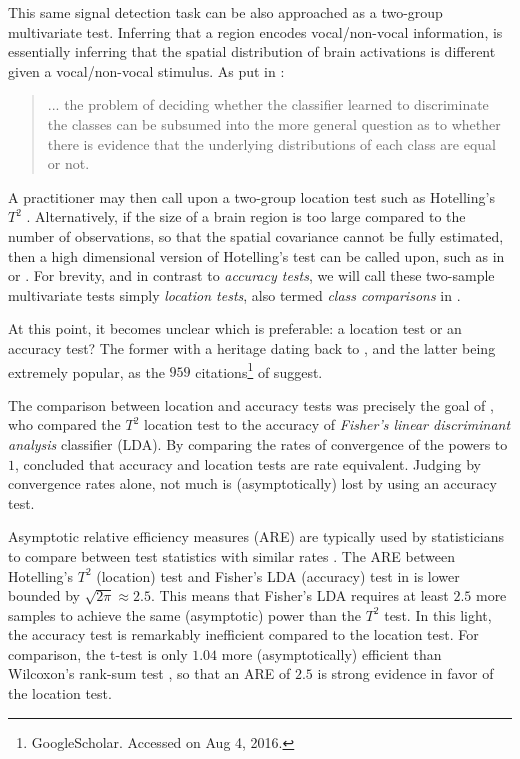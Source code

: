\documentclass[12pt,a4paper]{article}
\begin{document}
This same signal detection task can be also approached as a two-group multivariate test.
Inferring that a region encodes vocal/non-vocal information, is essentially inferring that the spatial distribution of brain activations is different given a vocal/non-vocal stimulus. 
As put in \cite{pereira_machine_2009}: 
\begin{quote}
... the problem of deciding whether the classifier learned to discriminate the classes can be subsumed into the more general question as to whether there is evidence that the underlying distributions of each class are equal or not.
\end{quote}
A practitioner may then call upon a two-group location test such as Hotelling's $T^2$ \citep{anderson_introduction_2003}.
Alternatively, if the size of a brain region is too large compared to the number of observations, so that the spatial covariance cannot be fully estimated, then a high dimensional version of Hotelling's test can be called upon, such as in \cite{schafer_shrinkage_2005} or \cite{srivastava_testing_2013}.
For brevity, and in contrast to \emph{accuracy tests}, we will call these two-sample multivariate tests simply \emph{location tests}, also termed \emph{class comparisons} in \cite{simon_pitfalls_2003}.

At this point, it becomes unclear which is preferable: a location test or an accuracy test?
The former with a heritage dating back to \cite{hotelling_generalization_1931}, and the latter being extremely popular, as the $959$ citations\footnote{GoogleScholar. Accessed on Aug 4, 2016.} of \cite{kriegeskorte_information-based_2006} suggest. 

The comparison between location and accuracy tests was precisely the goal of \cite{ramdas_classification_2016}, who compared the $T^2$ location test to the accuracy of \emph{Fisher's linear discriminant analysis} classifier (LDA). 
By comparing the rates of convergence of the powers to $1$, \cite{ramdas_classification_2016} concluded that accuracy and location tests are rate equivalent. 
Judging by convergence rates alone, not much is (asymptotically) lost by using an accuracy test. 

Asymptotic relative efficiency measures (ARE) are typically used by statisticians to compare between test statistics with similar rates \citep{vaart_asymptotic_1998}.
The ARE between Hotelling's $T^2$ (location) test and Fisher's LDA (accuracy) test in \cite{ramdas_classification_2016} is lower bounded by $\sqrt{2 \pi} \approx 2.5$. 
This means that Fisher's LDA requires at least $2.5$ more samples to achieve the same (asymptotic) power than the $T^2$ test. 
In this light, the accuracy test is remarkably inefficient compared to the location test.  
For comparison, the t-test is only $1.04$ more (asymptotically) efficient than Wilcoxon's rank-sum test \citep{lehmann_parametric_2009}, so that an ARE of $2.5$ is strong evidence in favor of the location test. 
\end{document}
